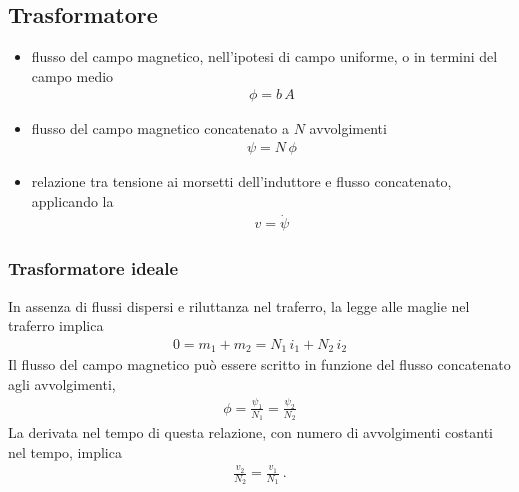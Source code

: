 \documentclass[letterpaper,10pt,italian]{jupyterBook}
\begin{document}
\subsection{Trasformatore}
\label{\detokenize{ch/circuits-electromagnetic-transformer:trasformatore}}\label{\detokenize{ch/circuits-electromagnetic-transformer:classical-electromagnetism-circuits-electromagnetic-transformer}}\label{\detokenize{ch/circuits-electromagnetic-transformer::doc}}\begin{itemize}
\item {} 
\sphinxAtStartPar
flusso del campo magnetico, nell’ipotesi di campo uniforme, o in termini del campo medio
\begin{equation*}
\begin{split}\phi = b \, A\end{split}
\end{equation*}
\item {} 
\sphinxAtStartPar
flusso del campo magnetico concatenato a \(N\) avvolgimenti
\begin{equation*}
\begin{split}\psi = N \, \phi\end{split}
\end{equation*}
\item {} 
\sphinxAtStartPar
relazione tra tensione ai morsetti dell’induttore e flusso concatenato, applicando la {\hyperref[\detokenize{ch/circuits-electric-induction:classical-electromagnetism-circuits-electric-induction}]{}}
\begin{equation*}
\begin{split}v = \dot{\psi}\end{split}
\end{equation*}
\end{itemize}


\subsubsection{Trasformatore ideale}
\label{\detokenize{ch/circuits-electromagnetic-transformer:trasformatore-ideale}}
\sphinxAtStartPar
In assenza di flussi dispersi e riluttanza nel traferro, la legge alle maglie nel traferro implica
\begin{equation*}
\begin{split}0 = m_1 + m_2 = N_1 \, i_1 + N_2 \, i_2\end{split}
\end{equation*}
\sphinxAtStartPar
Il flusso del campo magnetico può essere scritto in funzione del flusso concatenato agli avvolgimenti,
\begin{equation*}
\begin{split}\phi = \frac{\psi_1}{N_1} = \frac{\psi_2}{N_2}\end{split}
\end{equation*}
\sphinxAtStartPar
La derivata nel tempo di questa relazione, con numero di avvolgimenti costanti nel tempo, implica
\begin{equation*}
\begin{split}\frac{v_2}{N_2} = \frac{v_1}{N_1} \ .\end{split}
\end{equation*}
\end{document}
